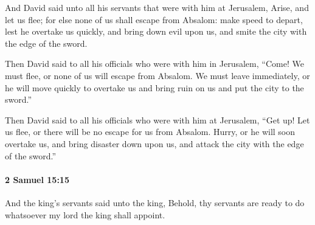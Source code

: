 			\begin{versebox}
					\item[BHS] 
					\item[ASV] And David said unto all his servants that were with him at Jerusalem, Arise, and let us flee; for else none of us shall escape from Absalom: make speed to depart, lest he overtake us quickly, and bring down evil upon us, and smite the city with the edge of the sword.
					\item[NIV] Then David said to all his officials who were with him in Jerusalem, “Come! We must flee, or none of us will escape from Absalom. We must leave immediately, or he will move quickly to overtake us and bring ruin on us and put the city to the sword.”
					\item[NRSV] Then David said to all his officials who were with him at Jerusalem, “Get up! Let us flee, or there will be no escape for us from Absalom. Hurry, or he will soon overtake us, and bring disaster down upon us, and attack the city with the edge of the sword.”
			\end{versebox}

		\paragraph{2 Samuel 15:15} %
			\label{2SAMUEL-15-15}

			And the king’s servants said unto the king, Behold, thy servants are ready to do whatsoever my lord the king shall appoint.


